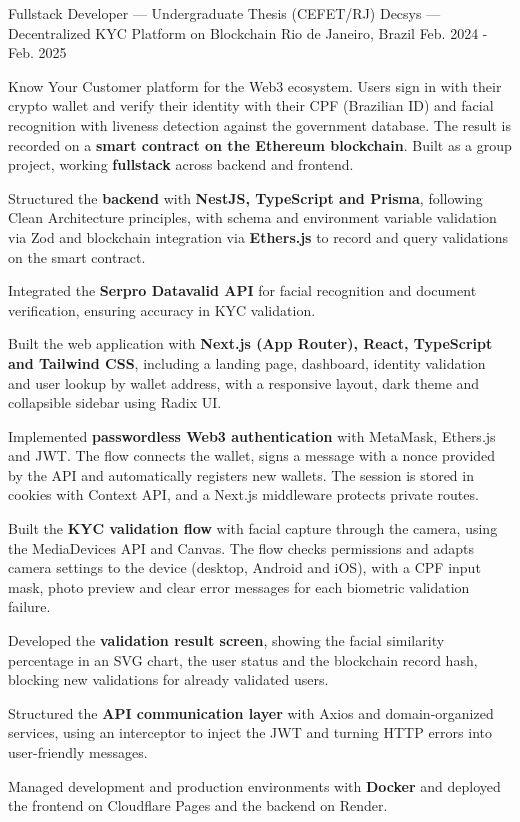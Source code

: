 \begin{cventries}
  \cventry
    {Fullstack Developer --- Undergraduate Thesis (CEFET/RJ)} %
    {Decsys --- Decentralized KYC Platform on Blockchain} %
    {Rio de Janeiro, Brazil} %
    {Feb. 2024 - Feb. 2025} %
    {
      \begin{cvitems} %
        \item {Know Your Customer platform for the Web3 ecosystem. Users sign in with their crypto wallet and verify their identity with their CPF (Brazilian ID) and facial recognition with liveness detection against the government database. The result is recorded on a \textbf{smart contract on the Ethereum blockchain}. Built as a group project, working \textbf{fullstack} across backend and frontend.}
        \item {Structured the \textbf{backend} with \textbf{NestJS, TypeScript and Prisma}, following Clean Architecture principles, with schema and environment variable validation via Zod and blockchain integration via \textbf{Ethers.js} to record and query validations on the smart contract.}
        \item {Integrated the \textbf{Serpro Datavalid API} for facial recognition and document verification, ensuring accuracy in KYC validation.}
        \item {Built the web application with \textbf{Next.js (App Router), React, TypeScript and Tailwind CSS}, including a landing page, dashboard, identity validation and user lookup by wallet address, with a responsive layout, dark theme and collapsible sidebar using Radix UI.}
        \item {Implemented \textbf{passwordless Web3 authentication} with MetaMask, Ethers.js and JWT. The flow connects the wallet, signs a message with a nonce provided by the API and automatically registers new wallets. The session is stored in cookies with Context API, and a Next.js middleware protects private routes.}
        \item {Built the \textbf{KYC validation flow} with facial capture through the camera, using the MediaDevices API and Canvas. The flow checks permissions and adapts camera settings to the device (desktop, Android and iOS), with a CPF input mask, photo preview and clear error messages for each biometric validation failure.}
        \item {Developed the \textbf{validation result screen}, showing the facial similarity percentage in an SVG chart, the user status and the blockchain record hash, blocking new validations for already validated users.}
        \item {Structured the \textbf{API communication layer} with Axios and domain-organized services, using an interceptor to inject the JWT and turning HTTP errors into user-friendly messages.}
        \item {Managed development and production environments with \textbf{Docker} and deployed the frontend on Cloudflare Pages and the backend on Render.}
      \end{cvitems}
    }


\end{cventries}
